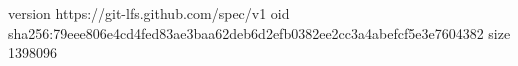 version https://git-lfs.github.com/spec/v1
oid sha256:79eee806e4cd4fed83ae3baa62deb6d2efb0382ee2cc3a4abefcf5e3e7604382
size 1398096
